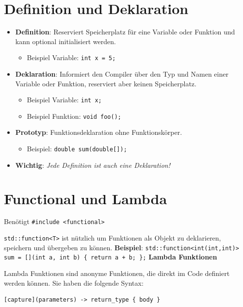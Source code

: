 \documentclass[9pt, a3paper, landscape]{article}
\newcommand{\algo}[1]{\textbf{\textcolor{blue!60!black}{#1}}}
\newcommand{\datastruct}[1]{\textbf{\textcolor{red!60!black}{#1}}}
\begin{document}
\begin{multicols*}{4}
\section{Definition und Deklaration}
\begin{itemize}
    \item \algo{Definition}: Reserviert Speicherplatz für eine Variable oder Funktion und kann optional initialisiert werden.
    \begin{itemize}
        \item Beispiel Variable: \lstinline|int x = 5;|
    \end{itemize}
    \item \datastruct{Deklaration}: Informiert den Compiler über den Typ und Namen einer Variable oder Funktion, reserviert aber keinen Speicherplatz.
    \begin{itemize}
        \item Beispiel Variable: \lstinline|int x;|
        \item Beispiel Funktion: \lstinline|void foo();|
    \end{itemize}
    \item \datastruct{Prototyp}: Funktionsdeklaration ohne Funktionskörper.
    \begin{itemize}
        \item Beispiel: \lstinline|double sum(double[]);|
    \end{itemize}
    \item \algo{Wichtig}: \textit{Jede Definition ist auch eine Deklaration!}
\end{itemize}

\section{Functional und Lambda}

Benötigt \lstinline|#include <functional>|

\lstinline|std::function<T>| ist nützlich um Funktionen als Objekt zu deklarieren, speichern und übergeben zu können. \algo{Beispiel}: \newline
\lstinline|std::function<int(int,int)> sum = [](int a, int b) { return a + b; };|
\newline
\newline
\datastruct{Lambda Funktionen}

Lambda Funktionen sind anonyme Funktionen, die direkt im Code definiert werden können. Sie haben die folgende Syntax:

\lstinline|[capture](parameters) -> return_type { body }|


\end{multicols*}
\end{document}
